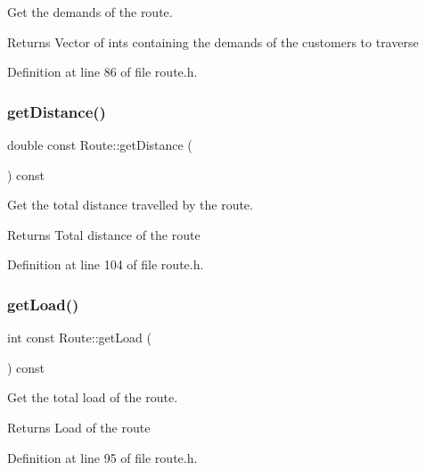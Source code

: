 Get the demands of the route. \begin{DoxyReturn}{Returns}
Vector of ints containing the demands of the customers to traverse 
\end{DoxyReturn}


Definition at line 86 of file route.\+h.

\mbox{\label{class_route_a5326c0234e1ed102bf9f8cf8236de8bd}} 
\subsubsection{\texorpdfstring{get\+Distance()}{getDistance()}}
{\footnotesize\ttfamily double const Route\+::get\+Distance (\begin{DoxyParamCaption}{ }\end{DoxyParamCaption}) const\hspace{0.3cm}{\ttfamily [inline]}}

Get the total distance travelled by the route. \begin{DoxyReturn}{Returns}
Total distance of the route 
\end{DoxyReturn}


Definition at line 104 of file route.\+h.

\mbox{\label{class_route_abdde0209de6671eac1fabd237804ff19}} 
\subsubsection{\texorpdfstring{get\+Load()}{getLoad()}}
{\footnotesize\ttfamily int const Route\+::get\+Load (\begin{DoxyParamCaption}{ }\end{DoxyParamCaption}) const\hspace{0.3cm}{\ttfamily [inline]}}

Get the total load of the route. \begin{DoxyReturn}{Returns}
Load of the route 
\end{DoxyReturn}


Definition at line 95 of file route.\+h.

\mbox{\label{class_route_a9a12c02d891924f0050d3d6bc7af1e18}} 
